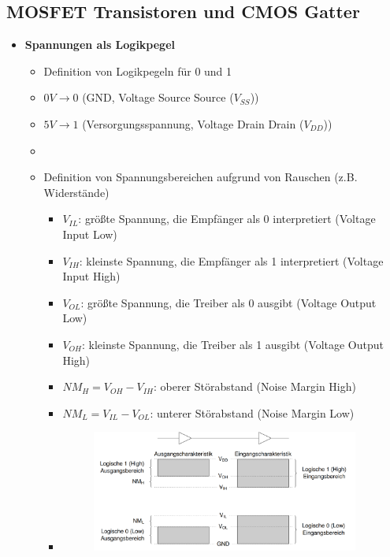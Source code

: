 \documentclass[11pt,a4paper]{article}
\begin{document}
\subsection{MOSFET Transistoren und CMOS Gatter}
\begin{itemize}

\item \textbf{Spannungen als Logikpegel}
	\begin{itemize}
	\item Definition von Logikpegeln für 0 und 1
	\item $0V \rightarrow 0$ (GND, Voltage Source Source ($V_{SS}$))
	\item $5V \rightarrow 1$ (Versorgungsspannung, Voltage Drain Drain ($V_{DD}$))
	\item[]
	\item Definition von Spannungsbereichen aufgrund von Rauschen (z.B. Widerstände)
		\begin{itemize}
		\item $V_{IL}$: größte Spannung, die Empfänger als 0 interpretiert (Voltage Input Low)
		\item $V_{IH}$: kleinste Spannung, die Empfänger als 1 interpretiert (Voltage Input High)
		\item $V_{OL}$: größte Spannung, die Treiber als 0 ausgibt (Voltage Output Low)
		\item $V_{OH}$: kleinste Spannung, die Treiber als 1 ausgibt (Voltage Output High)
		\item $NM_H= V_{OH} - V_{IH}$: oberer Störabstand (Noise Margin High)
		\item $NM_L = V_{IL} - V_{OL}$: unterer Störabstand (Noise Margin Low)
		\item[] \begin{figure}[H]
				\begin{center}
				\includegraphics[height=4cm]{spannungsbereiche}
				\end{center}
				\end{figure}
		\end{itemize}
	\end{itemize}


\end{itemize}
\end{document}
